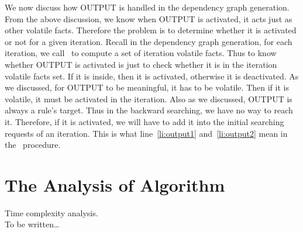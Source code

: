 \documentclass{article}
\begin{document}
We now discuss how OUTPUT is handled in the dependency graph
generation. From the above discussion, we know when OUTPUT is
activated, it acts just as other volatile facts. Therefore the problem
is to determine whether it is activated or not for a given
iteration. Recall in the dependency graph generation, for each
iteration, we call~ to compute a set of
iteration volatile facts. Thus to know whether OUTPUT is activated is
just to check whether it is in the iteration volatile facts set. If it
is inside, then it is activated, otherwise it is deactivated. As we
discussed, for OUTPUT to be meaningful, it has to be volatile. Then if
it is volatile, it must be activated in the iteration. Also as we
discussed, OUTPUT is always a rule's target. Thus in the backward
searching, we have no way to reach it. Therefore, if it is activated,
we will have to add it into the initial searching requests of an
iteration. This is what line~\ref{li:output1} and~\ref{li:output2}
mean in the~ procedure. 


\section{The Analysis of Algorithm}
Time complexity analysis.\\
To be written\dots
\end{document}
